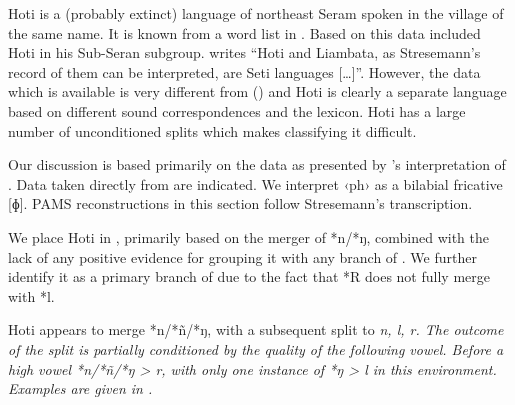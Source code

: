 Hoti is a (probably extinct) language of northeast Seram spoken
in the village of the same name.
It is known from a word list in \citet{Ludeking1868}.
Based on this data \citet{Stresemann1927} included Hoti in his Sub-Seran subgroup.
\citet[117]{Collins1982c} writes “Hoti
and Liambata, as Stresemann’s record of them can be interpreted,
are Seti languages [{\ldots}]”.
However, the data which is available is very different from 
() and Hoti is clearly a separate language based on different sound
correspondences and the lexicon.
Hoti has a large number of unconditioned splits which makes classifying it difficult.

Our discussion is based primarily on the data as presented by
\citeauthor{Stresemann1927}’s \citeyear{Stresemann1927} interpretation of \citet{Ludeking1868}.
Data taken directly from \citet{Ludeking1868} are indicated.
We interpret ‹ph› as a bilabial fricative [ɸ].
PAMS reconstructions in this section follow Stresemann’s transcription.

We place Hoti in ,
primarily based on the merger of *n/*ŋ,
combined with the lack of any positive evidence for grouping
it with any branch of .
We further identify it as a primary branch of 
due to the fact that *R does not fully merge with *l.

Hoti appears to merge *n/*ñ/*ŋ,
with a subsequent split to \it{n, l, r}.
The outcome of the split is partially conditioned by the quality
of the following vowel.
Before a high vowel *n/*ñ/*ŋ > \it{r},
with only one instance of *ŋ > \it{l} in this environment.
Examples are given in .


